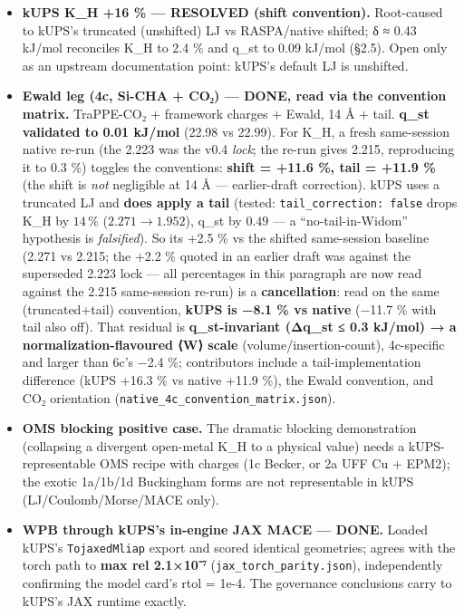 \begin{itemize}
\tightlist
\item
  \textbf{kUPS K\_H +16 \% --- RESOLVED (shift convention).} Root-caused
  to kUPS's truncated (unshifted) LJ vs RASPA/native shifted; δ ≈ 0.43
  kJ/mol reconciles K\_H to 2.4 \% and q\_st to 0.09 kJ/mol (§2.5). Open
  only as an upstream documentation point: kUPS's default LJ is
  unshifted.
\item
  \textbf{Ewald leg (4c, Si-CHA + CO₂) --- DONE, read via the convention
  matrix.} TraPPE-CO₂ + framework charges + Ewald, 14 Å + tail.
  \textbf{q\_st validated to 0.01 kJ/mol} (22.98 vs 22.99). For K\_H, a
  fresh same-session native re-run (the 2.223 was the v0.4 \emph{lock};
  the re-run gives 2.215, reproducing it to 0.3 \%) toggles the
  conventions: \textbf{shift = +11.6 \%, tail = +11.9 \%} (the shift is
  \emph{not} negligible at 14 Å --- earlier-draft correction). kUPS uses
  a truncated LJ and \textbf{does apply a tail} (tested:
  \texttt{tail\_correction:\ false} drops K\_H by \(14\,\%\) (\(2.271 \to 1.952\)), q\_st by \(0.49\) --- a
  ``no-tail-in-Widom'' hypothesis is \emph{falsified}). So its +2.5 \%
  vs the shifted same-session baseline (2.271 vs 2.215; the +2.2 \%
  quoted in an earlier draft was against the superseded 2.223 lock ---
  all percentages in this paragraph are now read against the 2.215
  same-session re-run) is a \textbf{cancellation}: read on the same
  (truncated+tail) convention, \textbf{kUPS is −8.1 \% vs native} (−11.7
  \% with tail also off). That residual is \textbf{q\_st-invariant
  (Δq\_st ≤ 0.3 kJ/mol) → a normalization-flavoured ⟨W⟩ scale}
  (volume/insertion-count), 4c-specific and larger than 6c's −2.4 \%;
  contributors include a tail-implementation difference (kUPS +16.3 \%
  vs native +11.9 \%), the Ewald convention, and CO₂ orientation
  (\texttt{native\_4c\_convention\_matrix.json}).
\item
  \textbf{OMS blocking positive case.} The dramatic blocking
  demonstration (collapsing a divergent open-metal K\_H to a physical
  value) needs a kUPS-representable OMS recipe with charges (1c Becker,
  or 2a UFF Cu + EPM2); the exotic 1a/1b/1d Buckingham forms are not
  representable in kUPS (LJ/Coulomb/Morse/MACE only).
\item
  \textbf{WPB through kUPS's in-engine JAX MACE --- DONE.} Loaded kUPS's
  \texttt{TojaxedMliap} export and scored identical geometries; agrees
  with the torch path to \textbf{max rel 2.1×10⁻⁷}
  (\texttt{jax\_torch\_parity.json}), independently confirming the model
  card's rtol = 1e-4. The governance conclusions carry to kUPS's JAX
  runtime exactly.
\end{itemize}


